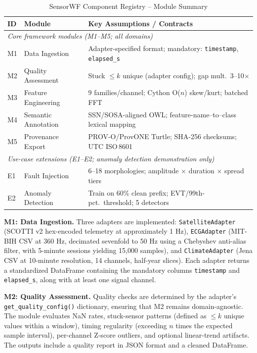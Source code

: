 \documentclass[conference]{IEEEtran}
\newcommand\Logan[1]{\leavevmode{\footnotesize\textbf{[Logan: #1]}}}
\begin{document}
\begin{table}[t]
\caption{SensorWF Component Registry -- Module Summary}
\label{tab:registry}
\centering
\scriptsize
\setlength{\tabcolsep}{3pt}
\begin{tabular}{@{}lp{1.7cm}p{4.1cm}@{}}
\toprule
\textbf{ID} & \textbf{Module} & \textbf{Key Assumptions / Contracts} \\
\midrule
\multicolumn{3}{l}{\textit{Core framework modules (M1--M5; all domains)}} \\
M1 & Data Ingestion     & Adapter-specified format; mandatory: \texttt{timestamp}, \texttt{elapsed\_s} \\
M2 & Quality Assessment & Stuck $\le k$ unique (adapter config); gap mult.\ 3--10$\times$ \\
M3 & Feature Engineering& 9 families/channel; Cython O($n$) skew/kurt; batched FFT \\
M4 & Semantic Annotation& SSN/SOSA-aligned OWL; feature-name--to--class lexical mapping \\
M5 & Provenance Export  & PROV-O/ProvONE Turtle; SHA-256 checksums; UTC ISO\,8601 \\
\midrule
\multicolumn{3}{l}{\textit{Use-case extensions (E1--E2; anomaly detection demonstration only)}} \\
E1 & Fault Injection    & 6--18 morphologies; amplitude $\times$ duration $\times$ spread tiers \\
E2 & Anomaly Detection  & Train on 60\% clean prefix; EVT/99th-pct.\ threshold; 5 detectors \\
\bottomrule
\end{tabular}
\end{table}

\textbf{M1: Data Ingestion.} Three adapters are implemented: \texttt{SatelliteAdapter} (SCOTTI v2 hex-encoded telemetry at approximately 1 Hz), \texttt{ECGAdapter} (MIT-BIH CSV at 360 Hz, decimated sevenfold to 50 Hz using a Chebyshev anti-alias filter, with 5-minute sessions yielding 15,000 samples), and \texttt{ClimateAdapter} (Jena CSV at 10-minute resolution, 14 channels, half-year slices). Each adapter returns a standardized DataFrame containing the mandatory columns \texttt{timestamp} and \texttt{elapsed\_s}, along with at least one signal channel.
\Logan{Expand}

\textbf{M2: Quality Assessment.} Quality checks are determined by the adapter's \texttt{get\_quality\_config()} dictionary, ensuring that M2 remains domain-agnostic. The module evaluates NaN rates, stuck-sensor patterns (defined as $\le k$ unique values within a window), timing regularity (exceeding $n$ times the expected sample interval), per-channel Z-score outliers, and optional linear-trend artifacts. The outputs include a quality report in JSON format and a cleaned DataFrame.
\end{document}
